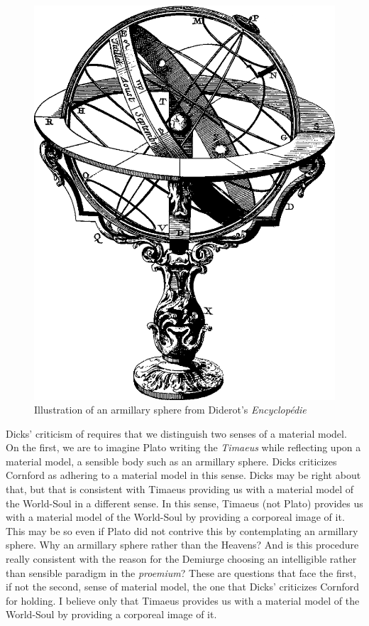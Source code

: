 \begin{figure}[htbp]
     \centering
         \includegraphics[scale=0.20]{graphics/Armillary_sphere.png}
     \caption{Illustration of an armillary sphere from Diderot's \emph{Encyclopédie}}
     \label{fig:2}
\end{figure}

Dicks' \citeyearpar{Dicks:1970aa} criticism of \citet{Cornford:1935fk} requires that we distinguish two senses of a material model. On the first, we are to imagine Plato writing the \emph{Timaeus} while reflecting upon a material model, a sensible body such as an armillary sphere. Dicks criticizes Cornford as adhering to a material model in this sense. Dicks may be right about that, but that is consistent with Timaeus providing us with a material model of the World-Soul in a different sense. In this sense, Timaeus (not Plato) provides us with a material model of the World-Soul by providing a corporeal image of it. This may be so even if Plato did not contrive this by contemplating an armillary sphere. Why an armillary sphere rather than the Heavens? And is this procedure really consistent with the reason for the Demiurge choosing an intelligible rather than sensible paradigm in the \emph{proemium}? These are questions that face the first, if not the second, sense of material model, the one that Dicks' criticizes Cornford for holding. I believe only that Timaeus provides us with a material model of the World-Soul by providing a corporeal image of it. 

